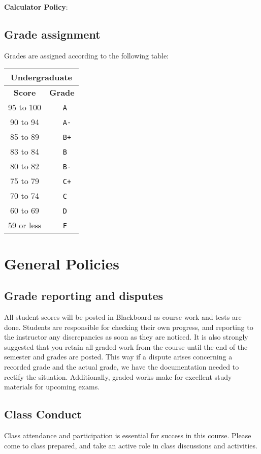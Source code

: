 \documentclass[12pt]{article}
\begin{document}
\medskip
\textbf{Calculator Policy}: 


\subsection{Grade assignment} Grades are assigned according to the following table:

\begin{center}
  \begin{tabular}[t]{c|cl}
    \multicolumn{3}{c}{\textbf{Undergraduate}}\\
    \hline
    \textbf{Score} & \multicolumn{2}{c}{\textbf{Grade}}\\
    \hline
    95 to 100	&& \ \texttt{A}\\
    90 to 94 	&& \ \texttt{A-}\\
    85 to 89 	&& \ \texttt{B+}\\
    83 to 84	&& \ \texttt{B}  \\
    80 to 82	&& \ \texttt{B-} \\
    75 to 79	&& \ \texttt{C+} \\
    70 to 74	&& \ \texttt{C}  \\
    60 to 69	&& \ \texttt{D}  \\
    59 or less  && \ \texttt{F}
  \end{tabular}
\end{center}

\section{General Policies}

\subsection {Grade reporting and disputes} All student scores will be posted in Blackboard
as course work and tests are done. Students are responsible for checking their own progress, and
reporting to the instructor any discrepancies as soon as they are noticed. It is also strongly suggested
that you retain all graded work from the course until the end of the semester and grades are posted.
This way if a dispute arises concerning a recorded grade and the actual grade, we have the documentation
needed to rectify the situation. Additionally, graded works make for excellent study materials for upcoming
exams.  

\subsection{Class Conduct}
Class attendance and participation is essential for success in this course. Please come to class prepared,
and take an active role in class discussions and activities.
\end{document}
